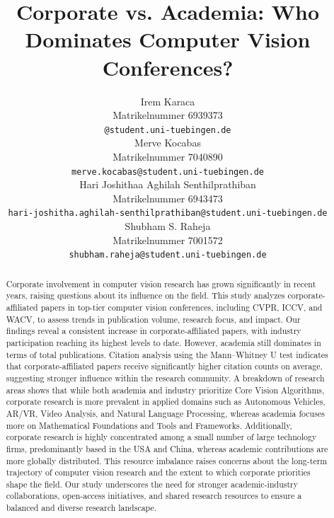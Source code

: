 \documentclass{article}
\title{Corporate vs. Academia: Who Dominates Computer Vision Conferences?}
\author{%
  Irem Karaca\\
  Matrikelnummer 6939373\\
  \texttt{@student.uni-tuebingen.de} \\
  \And
  Merve Kocabas\\
  Matrikelnummer 7040890\\
  \texttt{merve.kocabas@student.uni-tuebingen.de} \\
  \And
  Hari Joshithaa Aghilah Senthilprathiban\\
  Matrikelnummer 6943473\\
  \texttt{hari-joshitha.aghilah-senthilprathiban@student.uni-tuebingen.de} \\
  \And
  Shubham S. Raheja\\
  Matrikelnummer 7001572\\
  \texttt{shubham.raheja@student.uni-tuebingen.de} \\
}
\begin{document}
\maketitle

\begin{abstract}

  Corporate involvement in computer vision research has grown significantly in recent years, raising questions about its influence on the field. This study analyzes corporate-affiliated papers in top-tier computer vision conferences, including CVPR, ICCV, and WACV, to assess trends in publication volume, research focus, and impact. Our findings reveal a consistent increase in corporate-affiliated papers, with industry participation reaching its highest levels to date. However, academia still dominates in terms of total publications. Citation analysis using the Mann–Whitney U test indicates that corporate-affiliated papers receive significantly higher citation counts on average, suggesting stronger influence within the research community. A breakdown of research areas shows that while both academia and industry prioritize Core Vision Algorithms, corporate research is more prevalent in applied domains such as Autonomous Vehicles, AR/VR, Video Analysis, and Natural Language Processing, whereas academia focuses more on Mathematical Foundations and Tools and Frameworks. Additionally, corporate research is highly concentrated among a small number of large technology firms, predominantly based in the USA and China, whereas academic contributions are more globally distributed. This resource imbalance raises concerns about the long-term trajectory of computer vision research and the extent to which corporate priorities shape the field. Our study underscores the need for stronger academic-industry collaborations, open-access initiatives, and shared research resources to ensure a balanced and diverse research landscape. 
\end{abstract}

\end{document}
